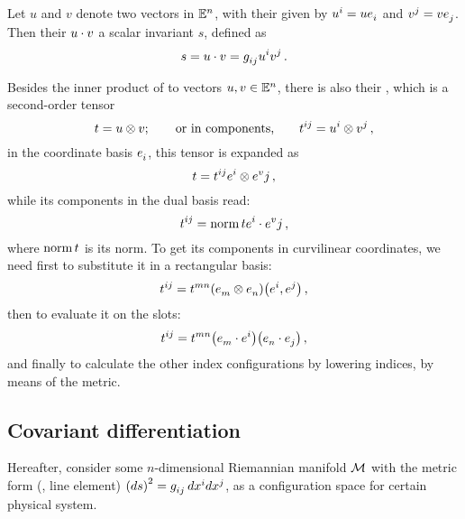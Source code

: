 Let $u$ and $v$ denote two vectors in $\mathbb{E}^{n}$, with their  given by $\tvec ui = u\tsbcov i$ and $\tvec vj = v\tsbcov j$. Then their  $u\cdot v$ a scalar invariant $s$, defined as
%
\begin{equation*}
  s = u\iprod v 
    = \tcovmet ij\tvec ui\tvec vj\,.
\end{equation*}

Besides the inner product of to vectors $u,v\in\mathbb{E}^{n}$, there is also their , which is a second-order tensor
%
\begin{equation*}
  t = u\tprod v;
  \qquad\text{or in components,}\qquad
  \tensor{t}{^i^j} = \tvec ui\tprod\tvec vj\,,
\end{equation*}
%
in the coordinate basis $\tsbcov i$, this tensor is expanded as
%
\begin{equation*}
  t = \tensor{t}{^i^j}\tsbvec i\tprod\tsbvec vj\,,
\end{equation*}
%
while its components in the dual basis read:
%
\begin{equation*}
  \tensor{t}{^i^j} = \norm t\tsbvec i\iprod\tsbvec vj\,,
\end{equation*}
%
where $\operatorname{norm} t$ is its norm. To get its components in curvilinear coordinates, we need first to substitute it in a rectangular basis:
%
\begin{equation*}
  \tensor{t}{^i^j} = \tensor{t}{^m^n}\parens{\tsbcov m\tprod\tsbcov n}\parens{\tsbvec i, \tsbvec j}\,,
\end{equation*}
%
then to evaluate it on the slots:
%
\begin{equation*}
  \tensor{t}{^i^j} = \tensor{t}{^m^n}\parens{\tsbcov m\iprod\tsbvec i}\parens{\tsbcov n\iprod\tsbcov j}\,,
\end{equation*}
%
and finally to calculate the other index configurations by lowering indices, by means of the metric.


\subsection{Covariant differentiation}
%
Hereafter, consider some $n$-dimensional Riemannian manifold $\manifold M$ with the metric form (\aka, line element) $\sqlinelem = \tcovmet ij\,d\tvec\pos i d\tvec\pos j$, as a configuration space for certain physical system.


